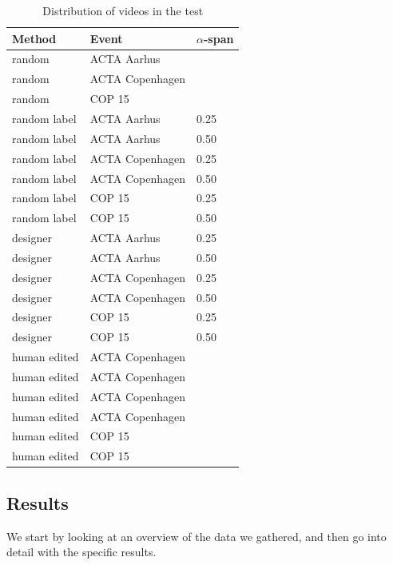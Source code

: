 \begin{table}\centering
    \begin{tabular}{|l|l|l|}
        \hline
        Method       & Event           & $\alpha$-span \\ \hline
        random       & ACTA Aarhus     & ~           \\ 
        random       & ACTA Copenhagen & ~           \\ 
        random       & COP 15          & ~           \\ 
        random label & ACTA Aarhus     & 0.25        \\ 
        random label & ACTA Aarhus     & 0.50        \\ 
        random label & ACTA Copenhagen & 0.25        \\ 
        random label & ACTA Copenhagen & 0.50        \\ 
        random label & COP 15          & 0.25        \\ 
        random label & COP 15          & 0.50        \\ 
        designer     & ACTA Aarhus     & 0.25        \\ 
        designer     & ACTA Aarhus     & 0.50        \\ 
        designer     & ACTA Copenhagen & 0.25        \\ 
        designer     & ACTA Copenhagen & 0.50        \\ 
        designer     & COP 15          & 0.25        \\ 
        designer     & COP 15          & 0.50        \\ 
        human edited & ACTA Copenhagen & ~           \\ 
        human edited & ACTA Copenhagen & ~           \\ 
        human edited & ACTA Copenhagen & ~           \\ 
        human edited & ACTA Copenhagen & ~           \\ 
        human edited & COP 15          & ~           \\ 
        human edited & COP 15          & ~           \\
        \hline
    \end{tabular}
\caption{Distribution of videos in the test}\label{tab:videosintest}
\end{table}
%
\subsection{Results}
%
We start by looking at an overview of the data we gathered, and then go into detail with the specific results.
%
